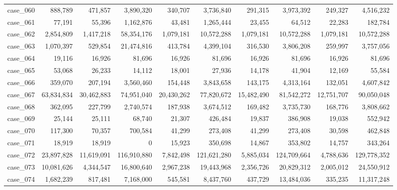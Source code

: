 \begin{footnotesize}
\begin{longtable}{l r rr rr rr rr}
case\_060 & 888{,}789 & 471{,}857 & 3{,}890{,}320 & 340{,}707 & 3{,}736{,}840 & 291{,}315 & 3{,}973{,}392 & 249{,}327 & 4{,}516{,}232 \\
case\_061 & 77{,}191 & 55{,}396 & 1{,}162{,}876 & 43{,}481 & 1{,}265{,}444 & 23{,}455 & 64{,}512 & 22{,}283 & 182{,}784 \\
case\_062 & 2{,}854{,}809 & 1{,}417{,}218 & 58{,}354{,}176 & 1{,}079{,}181 & 10{,}572{,}288 & 1{,}079{,}181 & 10{,}572{,}288 & 1{,}079{,}181 & 10{,}572{,}288 \\
case\_063 & 1{,}070{,}397 & 529{,}854 & 21{,}474{,}816 & 413{,}784 & 4{,}399{,}104 & 316{,}530 & 3{,}806{,}208 & 259{,}997 & 3{,}757{,}056 \\
case\_064 & 19{,}116 & 16{,}926 & 81{,}696 & 16{,}926 & 81{,}696 & 16{,}926 & 81{,}696 & 16{,}926 & 81{,}696 \\
case\_065 & 53{,}068 & 26{,}233 & 14{,}112 & 18{,}001 & 27{,}936 & 14{,}178 & 41{,}904 & 12{,}169 & 55{,}584 \\
case\_066 & 359{,}070 & 207{,}194 & 3{,}560{,}460 & 154{,}448 & 3{,}843{,}658 & 143{,}175 & 4{,}313{,}164 & 132{,}051 & 4{,}607{,}842 \\
case\_067 & 63{,}834{,}834 & 30{,}462{,}883 & 74{,}951{,}040 & 20{,}430{,}262 & 77{,}820{,}672 & 15{,}482{,}490 & 81{,}542{,}272 & 12{,}751{,}707 & 90{,}050{,}048 \\
case\_068 & 362{,}095 & 227{,}799 & 2{,}740{,}574 & 187{,}938 & 3{,}674{,}512 & 169{,}482 & 3{,}735{,}730 & 168{,}776 & 3{,}808{,}662 \\
case\_069 & 25{,}144 & 25{,}111 & 68{,}740 & 21{,}307 & 426{,}484 & 19{,}837 & 386{,}908 & 19{,}038 & 552{,}942 \\
case\_070 & 117{,}300 & 70{,}357 & 700{,}584 & 41{,}299 & 273{,}408 & 41{,}299 & 273{,}408 & 30{,}598 & 462{,}848 \\
case\_071 & 18{,}919 & 18{,}919 & 0 & 15{,}923 & 350{,}698 & 14{,}867 & 353{,}802 & 14{,}757 & 343{,}264 \\
case\_072 & 23{,}897{,}828 & 11{,}619{,}091 & 116{,}910{,}880 & 7{,}842{,}498 & 121{,}621{,}280 & 5{,}885{,}034 & 124{,}709{,}664 & 4{,}788{,}636 & 129{,}778{,}352 \\
case\_073 & 10{,}081{,}626 & 4{,}344{,}547 & 16{,}800{,}640 & 2{,}967{,}238 & 19{,}443{,}968 & 2{,}356{,}726 & 20{,}829{,}312 & 2{,}005{,}012 & 24{,}550{,}912 \\
case\_074 & 1{,}682{,}239 & 817{,}481 & 7{,}168{,}000 & 545{,}581 & 8{,}437{,}760 & 437{,}729 & 13{,}484{,}036 & 335{,}235 & 11{,}317{,}248 \\

\end{longtable}
\end{footnotesize}
